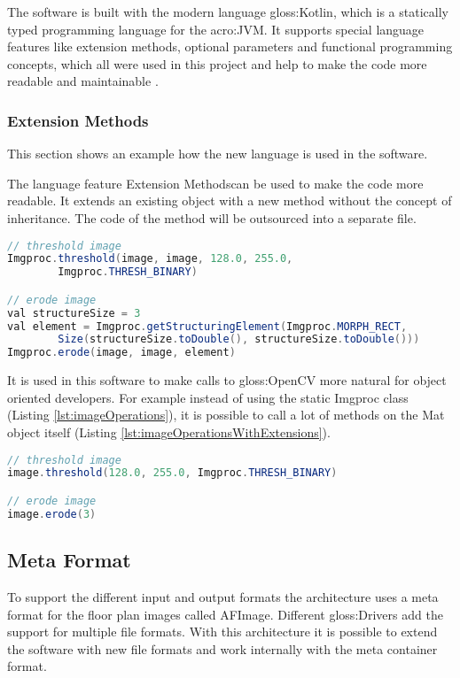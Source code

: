 The software is built with the modern language \gls{gloss:Kotlin}, which is a statically typed programming language for the \acrfull{acro:JVM}. It supports special language features like extension methods, optional parameters and functional programming concepts, which all were used in this project and help to make the code more readable and maintainable \citep{kotlin}.

\subsubsection{Extension Methods}
This section shows an example how the new language is used in the software.

The language feature \flqq Extension Methods\frqq  can be used to make the code more readable. It extends an existing object with a new method without the concept of inheritance. The code of the method will be outsourced into a separate file.

\begin{lstlisting}[caption={Erode image without extension methods},label={lst:imageOperations},language=Java]
// threshold image
Imgproc.threshold(image, image, 128.0, 255.0, 
		Imgproc.THRESH_BINARY)

// erode image
val structureSize = 3
val element = Imgproc.getStructuringElement(Imgproc.MORPH_RECT, 
        Size(structureSize.toDouble(), structureSize.toDouble()))
Imgproc.erode(image, image, element)
\end{lstlisting}

It is used in this software to make calls to \gls{gloss:OpenCV} more natural for object oriented developers. For example instead of using the static Imgproc class (Listing \ref{lst:imageOperations}), it is possible to call a lot of methods on the Mat object itself (Listing \ref{lst:imageOperationsWithExtensions}).

\begin{lstlisting}[caption={Erode image with extension methods},label={lst:imageOperationsWithExtensions},language=Java]
// threshold image
image.threshold(128.0, 255.0, Imgproc.THRESH_BINARY)

// erode image
image.erode(3)
\end{lstlisting}

\pagebreak

\subsection{Meta Format}
To support the different input and output formats the architecture uses a meta format for the
floor plan images called AFImage. Different \gls{gloss:Drivers} add the support for multiple file formats. With this architecture it is possible to extend the software with new file formats and work internally with the meta container format.

